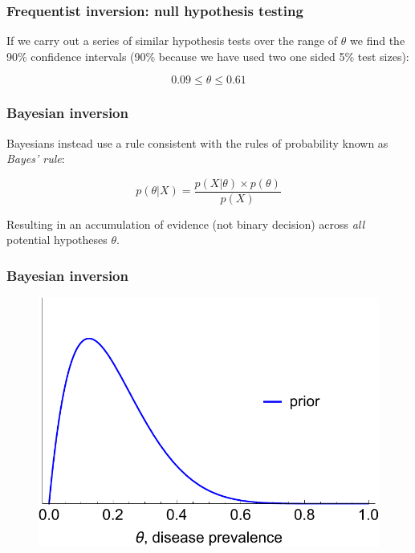 \documentclass[handout]{beamer}
\begin{document}
\begin{frame}
	\frametitle{Frequentist inversion: null hypothesis testing}
		If we carry out a series of similar hypothesis tests over the range of $\theta$ we find the 90\% confidence intervals (90\% because we have used two one sided 5\% test sizes):
		 
			\begin{equation}
			0.09 \leq \theta \leq 0.61
			\end{equation}
	
\end{frame}

\begin{frame}
	\frametitle{Bayesian inversion}
	Bayesians instead use a rule consistent with the rules of probability known as \textit{Bayes' rule}:
	
	\begin{equation}
	p(\theta|X) = \frac{p(X|\theta)\times p(\theta)}{p(X)}
	\end{equation}
	
	Resulting in an accumulation of evidence (not binary decision) across \textit{all} potential hypotheses $\theta$.
	
\end{frame}

\begin{frame}
	\frametitle{Bayesian inversion}
	
		\begin{figure}[ht]
			\centerline{\includegraphics[width=\textwidth]{figures/binomial_prior.pdf}}
		\end{figure}
	
\end{frame}
\end{document}
